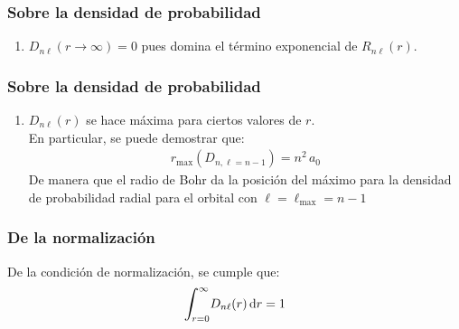 \documentclass[12pt]{beamer}
\begin{document}
\begin{frame}
\frametitle{Sobre la densidad de probabilidad}
\begin{enumerate}[<+->]
\conti
\item $D_{n \ell} (r \to \infty) = 0$ \pause pues domina el término exponencial de $R_{n \ell} (r)$.
\seti
\end{enumerate}
\end{frame}
\begin{frame}
\frametitle{Sobre la densidad de probabilidad}
\begin{enumerate}[<+->]
\conti
\item $D_{n \ell} (r)$ se hace máxima para ciertos valores de $r$.
\\
\bigskip
\pause
En particular, se puede demostrar que:
\begin{align*}
r_{\max} (D_{n, \ell=n-1}) = n^{2} \, a_{0}
\end{align*}
\pause
De manera que el radio de Bohr da la posición del máximo para la densidad de probabilidad radial para el orbital con $\ell = \ell_{\max} = n - 1$
\end{enumerate}
\end{frame}
\begin{frame}
\frametitle{De la normalización}
De la condición de normalización, se cumple que:
\pause
\begin{align*}
\scaleint{6ex}_{\bs r=0}^{\infty} D_{n \ell} (r) \dd{r} = 1
\end{align*}
\end{frame}
\end{document}
